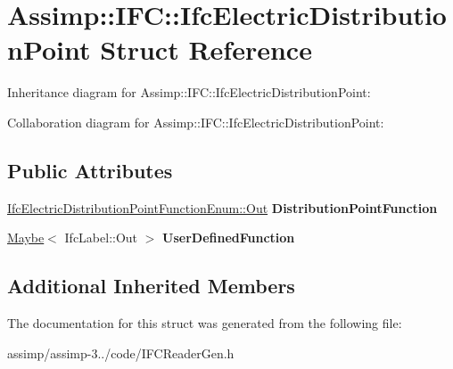 \hypertarget{struct_assimp_1_1_i_f_c_1_1_ifc_electric_distribution_point}{\section{Assimp\+:\+:I\+F\+C\+:\+:Ifc\+Electric\+Distribution\+Point Struct Reference}
\label{struct_assimp_1_1_i_f_c_1_1_ifc_electric_distribution_point}
}


Inheritance diagram for Assimp\+:\+:I\+F\+C\+:\+:Ifc\+Electric\+Distribution\+Point\+:


Collaboration diagram for Assimp\+:\+:I\+F\+C\+:\+:Ifc\+Electric\+Distribution\+Point\+:
\subsection*{Public Attributes}
\begin{DoxyCompactItemize}
\item 
\hypertarget{struct_assimp_1_1_i_f_c_1_1_ifc_electric_distribution_point_ac681d8f2c568d60cd9ca55ec8cff6152}{\hyperlink{classboost_1_1shared__ptr}{Ifc\+Electric\+Distribution\+Point\+Function\+Enum\+::\+Out} {\bfseries Distribution\+Point\+Function}}\label{struct_assimp_1_1_i_f_c_1_1_ifc_electric_distribution_point_ac681d8f2c568d60cd9ca55ec8cff6152}

\item 
\hypertarget{struct_assimp_1_1_i_f_c_1_1_ifc_electric_distribution_point_a3bd1ee7ddb2ebd9c51ea2f8887c788c8}{\hyperlink{struct_assimp_1_1_s_t_e_p_1_1_maybe}{Maybe}$<$ Ifc\+Label\+::\+Out $>$ {\bfseries User\+Defined\+Function}}\label{struct_assimp_1_1_i_f_c_1_1_ifc_electric_distribution_point_a3bd1ee7ddb2ebd9c51ea2f8887c788c8}

\end{DoxyCompactItemize}
\subsection*{Additional Inherited Members}


The documentation for this struct was generated from the following file\+:\begin{DoxyCompactItemize}
\item 
assimp/assimp-\/3../code/I\+F\+C\+Reader\+Gen.\+h\end{DoxyCompactItemize}
